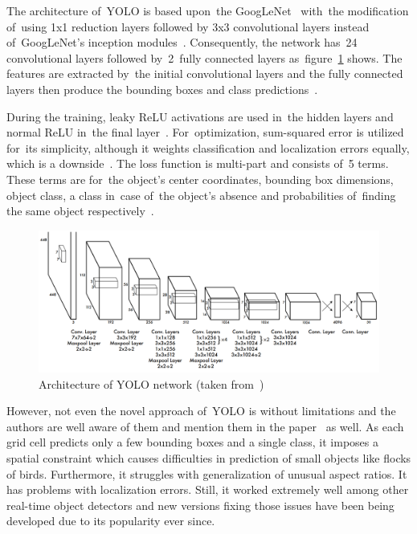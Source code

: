 The architecture of~YOLO is based upon~the GoogLeNet~\cite{googlenet} with~the modification of~using 1x1 reduction layers followed by 3x3 convolutional layers instead of~GoogLeNet's inception modules~\cite{yolo}. Consequently, the network has~24 convolutional layers followed by~2~fully connected layers as~figure~\ref{algorithms-yolo-architecture} shows. The features are extracted by~the initial convolutional layers and the fully connected layers then produce the bounding boxes and class predictions~\cite{yolo}.

During the training, leaky ReLU activations are used in~the hidden layers and normal ReLU in~the final layer~\cite{yolo}. For~optimization, sum-squared error is utilized for~its simplicity, although it weights classification and localization errors equally, which is a downside~\cite{yolo}. The loss function is multi-part and consists of~5 terms. These terms are for~the object's center coordinates, bounding box dimensions, object class, a class in~case of~the object's absence and probabilities of~finding the same object respectively~\cite{yolo-evolution}.

\begin{figure}[hbt]
    \includegraphics[width=1\textwidth]{img/algorithms/yolo-architecture.png}
    \caption{Architecture of YOLO network (taken from~\cite{yolo})}
    \label{algorithms-yolo-architecture}
\end{figure}

However, not even the novel approach of~YOLO is without limitations and the authors are well aware of them and mention them in the paper~\cite{yolo} as well. As each grid cell predicts only a few bounding boxes and a single class, it imposes a spatial constraint which causes difficulties in prediction of small objects like flocks of birds. Furthermore, it struggles with generalization of unusual aspect ratios. It has problems with localization errors. Still, it worked extremely well among other real-time object detectors and new versions fixing those issues have been being developed due to its popularity ever since.

